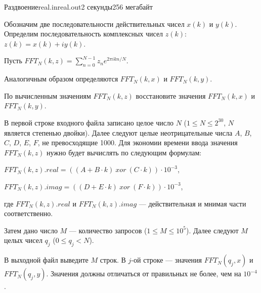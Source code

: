 \begin{problem}{Раздвоение}{real.in}{real.out}{2 секунды}{256 мегабайт}


Обозначим две последовательности действительных чисел $x(k)$ и $y(k)$.
Определим последовательность комплексных чисел $z(k)$: $z(k) = x(k) + iy(k)$.

Пусть $FFT_N(k, z) = \sum\limits^{N-1}_{n=0}z_ne^{2 \pi i k n / N}$.

Аналогичным образом определяются $FFT_N(k, x)$ и $FFT_N(k, y)$.

По вычисленным значениям $FFT_N(k, z)$
восстановите значения $FFT_N(k, x)$ и $FFT_N(k, y)$.

\InputFile

В первой строке входного файла записано целое число $N$ ($1 \le N \le 2^{30}$,
$N$ является степенью двойки).
Далее следуют целые неотрицательные числа $A$, $B$, $C$, $D$, $E$, $F$, не превосходящие 1000.
Для экономии времени ввода значения $FFT_N(k, z)$ нужно будет вычислять по следующим формулам:

$FFT_N(k, z).real = ((A + B \cdot k)\ xor \ (C \cdot k)) \cdot 10^{-3}$,

$FFT_N(k, z).imag = ((D + E \cdot k)\ xor \ (F \cdot k)) \cdot 10^{-3}$,

где $FFT_N(k, z).real$ и $FFT_N(k, z).imag$ --- действительная и мнимая части соответственно.

Затем дано число $M$ --- количество запросов ($1 \le M \le 10^5$).
Далее следуют $M$ целых чисел $q_j$ ($0 \le q_j < N$).

\OutputFile

В выходной файл выведите $M$ строк.
В $j$-ой строке --- значения $FFT_N(q_j, x)$ и $FFT_N(q_j, y)$.
Значения должны отличаться от правильных не более, чем на $10^{-4}$.

\Examples

\begin{example}
%
%
%
\end{example}

\end{problem}
